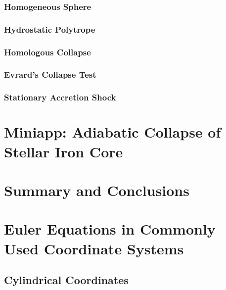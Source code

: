\documentclass[10pt,preprint]{aastex}
\begin{document}
\subsubsection{Homogeneous Sphere}

\subsubsection{Hydrostatic Polytrope}

\subsubsection{Homologous Collapse}

\subsubsection{Evrard's Collapse Test}

\subsubsection{Stationary Accretion Shock}

\section{Miniapp: Adiabatic Collapse of Stellar Iron Core}
\label{sec:MiniApp}

\section{Summary and Conclusions}




\appendix

\section{Euler Equations in Commonly Used Coordinate Systems}
\label{app:CurvilinearEuler}

\subsection{Cylindrical Coordinates}
\end{document}

